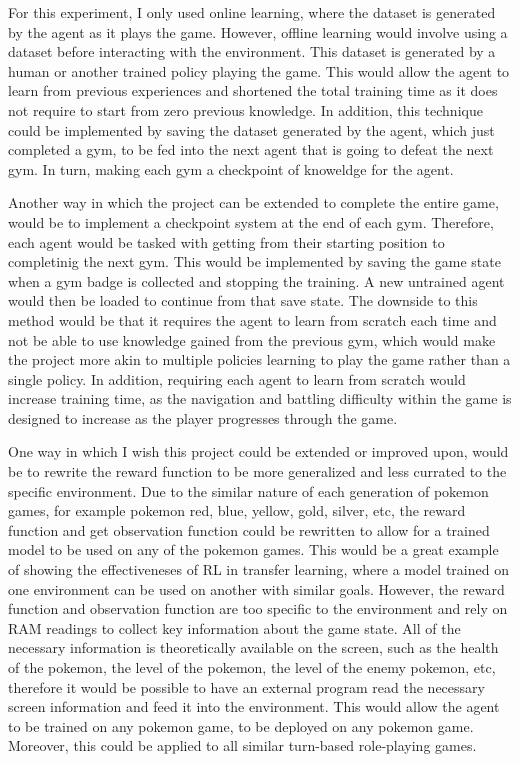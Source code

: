 For this experiment, I only used online learning, where the dataset is generated by the agent as it plays the game. However, offline learning would involve using a dataset before interacting with the environment. This dataset is generated by a human or another trained policy playing the game. This would allow the agent to learn from previous experiences and shortened the total training time as it does not require to start from zero previous knowledge. In addition, this technique could be implemented by saving the dataset generated by the agent, which just completed a gym, to be fed into the next agent that is going to defeat the next gym. In turn, making each gym a checkpoint of knoweldge for the agent. 

Another way in which the project can be extended to complete the entire game, would be to implement a checkpoint system at the end of each gym. Therefore, each agent would be tasked with getting from their starting position to completinig the next gym. This would be implemented by saving the game state when a gym badge is collected and stopping the training. A new untrained agent would then be loaded to continue from that save state. The downside to this method would be that it requires the agent to learn from scratch each time and not be able to use knowledge gained from the previous gym, which would make the project more akin to multiple policies learning to play the game rather than a single policy. In addition, requiring each agent to learn from scratch would increase training time, as the navigation and battling difficulty within the game is designed to increase as the player progresses through the game.

One way in which I wish this project could be extended or improved upon, would be to rewrite the reward function to be more generalized and less currated to the specific environment. Due to the similar nature of each generation of pokemon games, for example pokemon red, blue, yellow, gold, silver, etc, the reward function and get observation function could be rewritten to allow for a trained model to be used on any of the pokemon games. This would be a great example of showing the effectiveneses of RL in transfer learning, where a model trained on one environment can be used on another with similar goals. However, the reward function and observation function are too specific to the environment and rely on RAM readings to collect key information about the game state. All of the necessary information is theoretically available on the screen, such as the health of the pokemon, the level of the pokemon, the level of the enemy pokemon, etc, therefore it would be possible to have an external program read the necessary screen information and feed it into the environment. This would allow the agent to be trained on any pokemon game, to be deployed on any pokemon game. Moreover, this could be applied to all similar turn-based role-playing games. 

